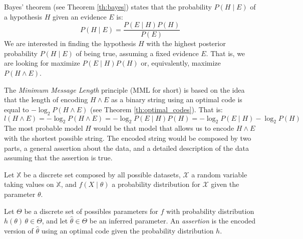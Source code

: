 Bayes' theorem (see Theorem \ref{th:bayes}) states that the probability $P(H \mid E)$ of a hypothesis $H$ given an evidence $E$ is:
\[
P(H \mid E) = \frac{ P( E \mid H ) P(H) }{ P(E) }
\]
We are interested in finding the hypothesis $H$ with the highest posterior probability $P(H \mid E)$ of being true, assuming a fixed evidence $E$. That is, we are looking for maximize $P( E \mid H ) P(H)$ or, equivalently, maximize $P ( H \wedge E )$.

The \emph{Minimum Message Length} principle (MML for short) is based on the idea that the length of encoding $H \wedge E$ as a binary string using an optimal code is equal to $- \log_2 P ( H \wedge E )$ (see Theorem \ref{th:optimal_codes}). That is:
\[
l(H \wedge E) = - \log_2 P ( H \wedge E ) = - \log_2 P( E \mid H ) P(H) = - \log_2 P( E \mid H ) - \log_2 P(H)
\]
The most probable model $H$ would be that model that allows us to encode $H \wedge E$ with the shortest possible string. The encoded string would be composed by two parts, a general assertion about the data, and a detailed description of the data assuming that the assertion is true.

Let $\mathbb{X}$ be a discrete set composed by all possible datasets, $\mathcal{X}$ a random variable taking values on $\mathbb{X}$, and $f(X \mid \theta)$ a probability distribution for $\mathcal{X}$ given the parameter $\theta$.

\begin{definition}
Let $\Theta$ be a discrete set of possibles parameters for $f$ with probability distribution $h(\theta) \, \theta \in \Theta$, and let $\hat\theta \in \Theta$ be an inferred parameter. An \emph{assertion} is the encoded version of $\hat\theta$ using an optimal code given the probability distribution $h$.
\end{definition}

